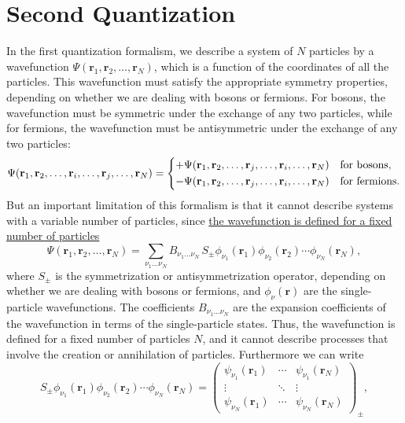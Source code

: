 \chapter{Second Quantization}

In the first quantization formalism, we describe a system of \(N\) particles by a wavefunction \(\Psi(\mathbf{r}_1, \mathbf{r}_2, \dots, \mathbf{r}_N)\), which is a function of the coordinates of all the particles. This wavefunction must satisfy the appropriate symmetry properties, depending on whether we are dealing with bosons or fermions. For bosons, the wavefunction must be symmetric under the exchange of any two particles, while for fermions, the wavefunction must be antisymmetric under the exchange of any two particles:
\[
    \Psi(\mathbf{r}_1, \mathbf{r}_2, \dots, \mathbf{r}_i, \dots, \mathbf{r}_j, \dots, \mathbf{r}_N) = \begin{dcases}
        +\Psi(\mathbf{r}_1, \mathbf{r}_2, \dots, \mathbf{r}_j, \dots, \mathbf{r}_i, \dots, \mathbf{r}_N) & \text{for bosons},   \\
        -\Psi(\mathbf{r}_1, \mathbf{r}_2, \dots, \mathbf{r}_j, \dots, \mathbf{r}_i, \dots, \mathbf{r}_N) & \text{for fermions}.
    \end{dcases}
\]
But an important limitation of this formalism is that it cannot describe systems with a variable number of particles, since \uline{the wavefunction is defined for a fixed number of particles}
\[
    \Psi(\mathbf{r}_1, \mathbf{r}_2, \dots, \mathbf{r}_N) = \sum_{\nu_1 \ldots \nu_N} B_{\nu_1 \ldots \nu_N} \, S_\pm \phi_{\nu_1}(\mathbf{r}_1) \phi_{\nu_2}(\mathbf{r}_2) \cdots \phi_{\nu_N}(\mathbf{r}_N),
\]
where \(S_\pm\) is the symmetrization or antisymmetrization operator, depending on whether we are dealing with bosons or fermions, and \(\phi_{\nu}(\mathbf{r})\) are the single-particle wavefunctions. The coefficients \(B_{\nu_1 \ldots \nu_N}\) are the expansion coefficients of the wavefunction in terms of the single-particle states. Thus, the wavefunction is defined for a fixed number of particles \(N\), and it cannot describe processes that involve the creation or annihilation of particles. Furthermore we can write
\[
    S_\pm \phi_{\nu_1}(\mathbf{r}_1) \phi_{\nu_2}(\mathbf{r}_2) \cdots \phi_{\nu_N}(\mathbf{r}_N) = \begin{pmatrix}
        \psi_{\nu_1}(\mathbf{r}_1) & \cdots & \psi_{\nu_1}(\mathbf{r}_N) \\
        \vdots                     & \ddots & \vdots                     \\
        \psi_{\nu_N}(\mathbf{r}_1) & \cdots & \psi_{\nu_N}(\mathbf{r}_N)
    \end{pmatrix}_\pm,
\]
